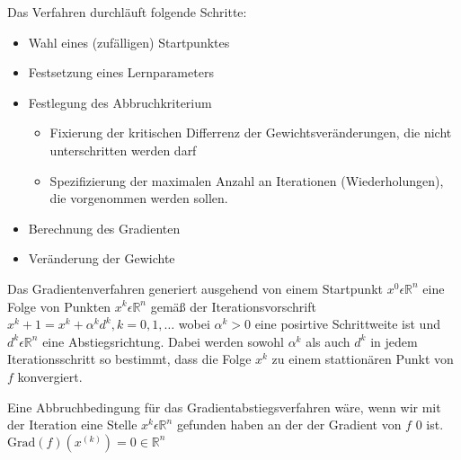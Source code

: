   Das Verfahren durchläuft folgende Schritte:
  \begin{itemize}
    \item Wahl eines (zufälligen) Startpunktes
  \end{itemize}
  \begin{itemize}
    \item Festsetzung eines Lernparameters
  \end{itemize}
  \begin{itemize}
    \item Festlegung des Abbruchkriterium
    \begin{itemize}
    \item Fixierung der kritischen Differrenz der Gewichtsveränderungen, die nicht unterschritten werden darf
    \item Spezifizierung der maximalen Anzahl an Iterationen (Wiederholungen), die vorgenommen werden sollen.
    \end{itemize}
  \end{itemize}
  \begin{itemize}
    \item  Berechnung des Gradienten
  \end{itemize}
  \begin{itemize}
    \item Veränderung der Gewichte
  \end{itemize}

  Das Gradientenverfahren generiert ausgehend von einem Startpunkt $x^0\epsilon\mathbb{R}^n$ eine Folge von Punkten $x^k\epsilon\mathbb{R}^n$ gemäß der Iterationsvorschrift $x^k+1=x^k+\alpha^k d^k, k=0,1,\dots$ 
  wobei $\alpha^k>0$ eine posirtive Schrittweite ist und $d^k\epsilon\mathbb{R}^n$ eine Abstiegsrichtung. Dabei werden sowohl $\alpha^k$ als auch $d^k$  in jedem Iterationsschritt so bestimmt, dass die Folge $x^k$
  zu einem stattionären Punkt von $f$ konvergiert.

  Eine Abbruchbedingung für das Gradientabstiegsverfahren wäre, wenn wir mit der Iteration eine Stelle $x^k\epsilon\mathbb{R}^n$ gefunden haben an der der Gradient von $f$ 0 ist.
  $\text{Grad}(f)(x^{(k)}) = 0 \in \mathbb{R}^n$

  
  
